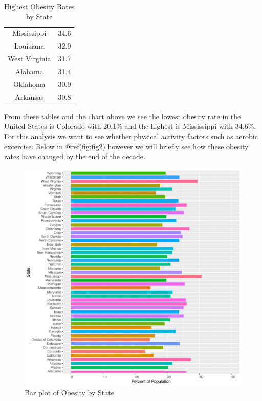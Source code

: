 \documentclass[
]{article}
\begin{document}
\begin{table}[H]

\caption{\label{tab:tab3}Highest Obesity Rates by State}
\begin{tabular}[t]{cc}
\toprule
Mississippi & 34.6\\
Louisiana & 32.9\\
West Virginia & 31.7\\
Alabama & 31.4\\
Oklahoma & 30.9\\
\addlinespace
Arkansas & 30.8\\
\bottomrule
\end{tabular}
\end{table}

From these tables and the chart above we see the lowest obesity rate in
the United States is Colorado with 20.1\% and the highest is Mississippi
with 34.6\%. For this analysis we want to see whether physical activity
factors such as aerobic excercise. Below in @ref(fig:fig2) however we
will briefly see how these obesity rates have changed by the end of the
decade.

\begin{figure}
\centering
\includegraphics{paper_files/figure-latex/fig2-1.pdf}
\caption{Bar plot of Obesity by State}
\end{figure}
\end{document}
